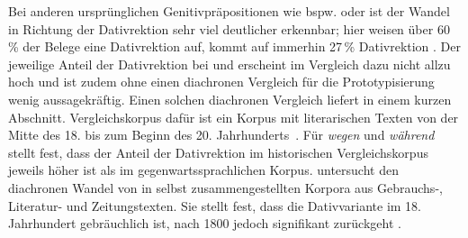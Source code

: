 Bei anderen ursprünglichen Genitivpräpositionen wie bspw.  oder  ist der Wandel in Richtung der Dativrektion sehr viel deutlicher erkennbar; hier weisen über 60\,\% der Belege eine Dativrektion auf,  kommt auf immerhin 27\,\% Dativrektion \citep[s.][208]{DiMeola2000}. 
Der jeweilige Anteil der Dativrektion bei  und  erscheint im Vergleich dazu nicht allzu hoch und ist zudem
ohne einen diachronen Vergleich für die Prototypisierung wenig aussagekräftig. 
Einen solchen diachronen Vergleich liefert \citet[]{DiMeola2000} in einem kurzen Abschnitt. 
Vergleichskorpus dafür ist ein Korpus mit literarischen Texten von der Mitte des 18. bis zum Beginn des 20. Jahrhunderts~\citep[s.][231]{DiMeola2000}. 
F{\"u}r \textit{wegen }und \textit{w{\"a}hrend }stellt \citet[236]{DiMeola2000} fest, dass der Anteil der Dativrektion im historischen Vergleichskorpus jeweils h{\"o}her ist als im gegenwartssprachlichen Korpus.
\citet{Sato.2022} untersucht den diachronen Wandel von \wegen{} in selbst zusammengestellten Korpora aus Gebrauchs-, Literatur- und Zeitungstexten. Sie stellt fest, dass die Dativvariante im 18. Jahrhundert gebräuchlich ist, nach 1800 jedoch signifikant zurückgeht \citep[s.][55]{Sato.2022}. 

